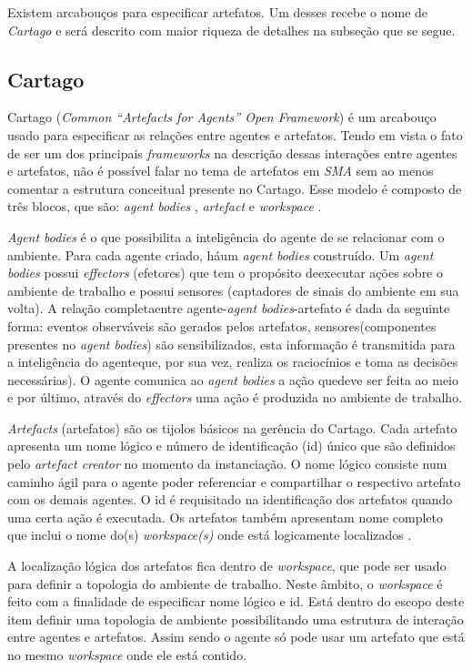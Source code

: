 Existem arcabouços para especificar artefatos. Um desses recebe o nome de \textit{Cartago} e será descrito com maior riqueza de detalhes na subseção que se segue.
 
\subsection{Cartago}

Cartago (\textit{Common ``Artefacts for Agents'' Open Framework}) é um arcabouço usado para especificar as relações entre agentes e artefatos. Tendo em vista o fato de ser um dos principais \textit{frameworks} na descrição dessas interações entre agentes e artefatos, não é possível falar no tema de artefatos em \textit{SMA} sem ao menos comentar a estrutura conceitual presente no Cartago. Esse modelo é composto de três blocos, que são: \textit{agent bodies} , \textit{artefact} e \textit{workspace} \cite{cartago}.

\textit{Agent bodies} é  o que possibilita a inteligência do agente de se relacionar com o ambiente. Para cada agente criado, háum \textit{agent bodies} construído. Um \textit{agent bodies} possui \textit{effectors} (efetores) que tem o propósito deexecutar ações sobre o ambiente de trabalho e possui sensores (captadores de sinais do ambiente em sua volta). A relação completaentre agente-\textit{agent bodies}-artefato é dada da seguinte forma: eventos observáveis são gerados pelos artefatos, sensores(componentes presentes no \textit{agent bodies}) são sensibilizados, esta informação é transmitida para a inteligência do  agenteque, por sua vez, realiza os raciocínios e toma as decisões necessárias). O agente comunica ao \textit{agent bodies} a ação quedeve ser feita ao meio e por último, através do \textit{effectors} uma ação é produzida no ambiente de trabalho. 

\textit{Artefacts} (artefatos) são os tijolos básicos na gerência do Cartago. Cada artefato apresenta um nome lógico e número de identificação (id) único que são definidos pelo \textit{artefact creator} no momento da instanciação. O nome lógico consiste num caminho ágil para o agente poder referenciar  e compartilhar o respectivo artefato com os demais agentes. O id é requisitado na identificação dos artefatos quando uma certa ação é executada. Os artefatos também apresentam nome completo que inclui o nome do(s) \textit{workspace(s)} onde está logicamente localizados \cite{cartago}.

A localização lógica dos artefatos fica dentro de \textit{workspace}, que pode ser usado para definir a topologia do ambiente de trabalho. Neste âmbito, o \textit{workspace} é feito com a finalidade de especificar nome lógico e id. Está dentro do escopo deste item definir uma topologia de ambiente possibilitando uma estrutura de interação entre agentes e artefatos. Assim sendo o agente só pode usar um artefato que está no mesmo \textit{workspace} onde ele está contido. 